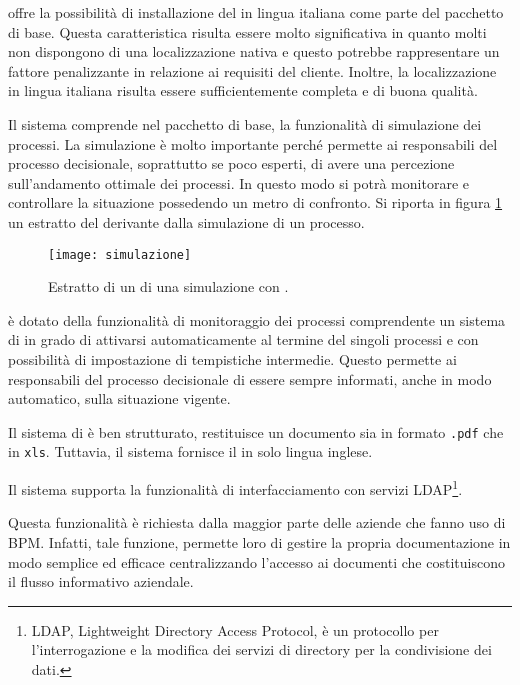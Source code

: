 \progname offre la possibilità di installazione del \sw in lingua italiana come parte del pacchetto di base. Questa caratteristica risulta essere molto significativa in quanto molti \sw non dispongono di una localizzazione nativa e questo potrebbe rappresentare un fattore penalizzante in relazione ai requisiti del cliente. Inoltre, la localizzazione in lingua italiana risulta essere sufficientemente completa e di buona qualità.

Il sistema \progname comprende nel pacchetto di base, la funzionalità di simulazione dei processi. La simulazione è molto importante perché permette ai responsabili del processo decisionale, soprattutto se poco esperti, di avere una percezione sull'andamento ottimale dei processi. In questo modo si potrà monitorare e controllare la situazione possedendo un metro di confronto.
Si riporta in figura \ref{fig:simulazione} un estratto del  derivante dalla simulazione di un processo.

\begin{figure}[H]
  \centering
  \texttt{[image: simulazione]}
  \caption{Estratto di un  di una simulazione con \progname.}
  \label{fig:simulazione}
\end{figure}

\progname è dotato della funzionalità di monitoraggio dei processi comprendente un sistema di  in grado di attivarsi automaticamente al termine del singoli processi e con possibilità di impostazione di tempistiche intermedie. Questo permette ai responsabili del processo decisionale di essere sempre informati, anche in modo automatico, sulla situazione vigente.

Il sistema di  è ben strutturato, restituisce un documento sia in formato \texttt{.pdf} che in \texttt{xls}. Tuttavia, il sistema fornisce il  in solo lingua inglese.

Il sistema supporta la funzionalità di interfacciamento con servizi LDAP\footnote{LDAP,  Lightweight Directory Access Protocol, è un protocollo  per l'interrogazione e la modifica dei servizi di directory per la condivisione dei dati.\label{note:ldap}}. 

Questa funzionalità è richiesta dalla maggior parte delle aziende che fanno uso di \sw BPM\@. Infatti, tale funzione, permette loro di gestire la propria documentazione in modo semplice ed efficace centralizzando l'accesso ai documenti che costituiscono il flusso informativo aziendale.

